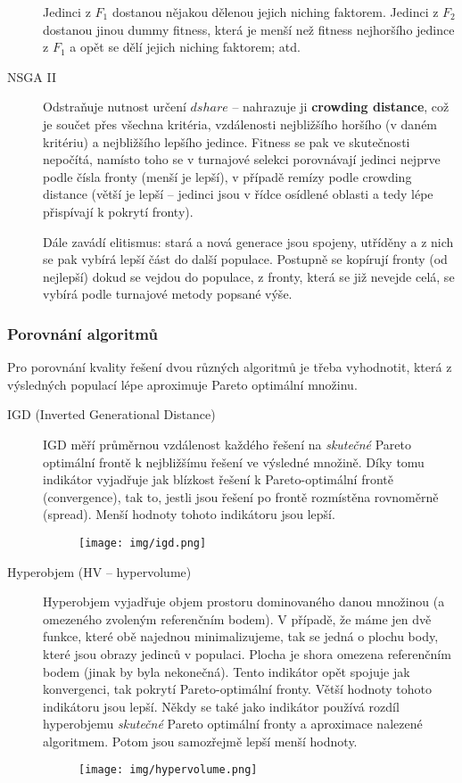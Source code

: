 \begin{description}
	Jedinci z $F_1$ dostanou nějakou  dělenou jejich niching faktorem. Jedinci z $F_2$ dostanou jinou dummy fitness, která je menší než fitness nejhoršího jedince z $F_1$ a opět se dělí jejich niching faktorem; atd.
	
	\item[NSGA II] Odstraňuje nutnost určení $dshare$ -- nahrazuje ji \textbf{crowding distance}, což je součet přes všechna kritéria, vzdálenosti nejbližšího horšího (v daném kritériu) a nejbližšího lepšího jedince. Fitness se pak ve skutečnosti nepočítá, namísto toho se v turnajové selekci porovnávají jedinci nejprve podle čísla fronty (menší je lepší), v případě remízy podle crowding distance (větší je lepší -- jedinci jsou v řídce osídlené oblasti a tedy lépe přispívají k pokrytí fronty).
	
	Dále zavádí elitismus: stará a nová generace jsou spojeny, utříděny a z nich se pak vybírá lepší část do další populace. Postupně se kopírují fronty (od nejlepší) dokud se vejdou do populace, z fronty, která se již nevejde celá, se vybírá podle turnajové metody popsané výše.
	
\end{description}

\subsubsection{Porovnání algoritmů}
Pro porovnání kvality řešení dvou různých algoritmů je třeba vyhodnotit, která z výsledných populací lépe aproximuje Pareto optimální množinu. 
\begin{description}
	
	
	\item[IGD (Inverted Generational Distance)] IGD měří průměrnou vzdálenost každého řeše\-ní na \textit{skutečné} Pareto optimální frontě k nejbližšímu řešení ve výsledné množině. Díky tomu indikátor vyjadřuje jak blízkost řešení k Pareto-optimální frontě (convergence), tak to, jestli jsou řešení po frontě rozmístěna rovnoměrně (spread). Menší hodnoty tohoto indikátoru jsou lepší. 
	\begin{figure}[H]
		\centering
		\texttt{[image: img/igd.png]}
	\end{figure}
	
	\item[Hyperobjem (HV -- hypervolume)] Hyperobjem vyjadřuje objem prostoru dominovaného danou množinou (a omezeného zvoleným referenčním bodem). V případě, že máme jen dvě funkce, které obě najednou minimalizujeme, tak se jedná o plochu  body, které jsou obrazy jedinců v populaci. Plocha je shora omezena referenčním bodem (jinak by byla nekonečná). Tento indikátor opět spojuje jak konvergenci, tak pokrytí Pareto-optimální fronty. Větší hodnoty tohoto indikátoru jsou lepší. Někdy se také jako indikátor používá rozdíl hyperobjemu \textit{skutečné} Pareto optimální fronty a aproximace nalezené algoritmem. Potom jsou samozřejmě lepší menší hodnoty.
	\begin{figure}[H]
		\centering
		\texttt{[image: img/hypervolume.png]}
	\end{figure}
	
\end{description}
